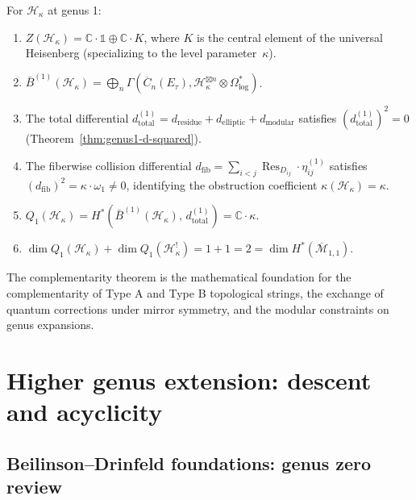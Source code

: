 \begin{example}
For $\mathcal{H}_\kappa$ at genus 1:
\begin{enumerate}
\item $Z(\mathcal{H}_\kappa) = \mathbb{C} \cdot \mathbb{1} \oplus \mathbb{C} \cdot
K$, where $K$ is the central element of the universal Heisenberg
(specializing to the level parameter~$\kappa$).
\item $\bar{B}^{(1)}(\mathcal{H}_\kappa) = \bigoplus_n \Gamma(\overline{C}_n(E_\tau),
\mathcal{H}_\kappa^{\boxtimes n} \otimes \Omega^*_{\log})$.
\item The total differential $d^{(1)}_{\mathrm{total}} = d_{\mathrm{residue}} +
d_{\mathrm{elliptic}} + d_{\mathrm{modular}}$ satisfies
$(d^{(1)}_{\mathrm{total}})^2 = 0$
(Theorem~\ref{thm:genus1-d-squared}).
\item The fiberwise collision differential
$d_{\mathrm{fib}} = \sum_{i<j} \operatorname{Res}_{D_{ij}} \cdot \eta_{ij}^{(1)}$ satisfies
$(d_{\mathrm{fib}})^2 = \kappa \cdot \omega_1 \neq 0$,
identifying the obstruction coefficient $\kappa(\mathcal{H}_\kappa) = \kappa$.
\item $Q_1(\mathcal{H}_\kappa) = H^*(\bar{B}^{(1)}(\mathcal{H}_\kappa),\,
d^{(1)}_{\mathrm{total}}) = \mathbb{C} \cdot \kappa$.
\item $\dim Q_1(\mathcal{H}_\kappa) + \dim Q_1(\mathcal{H}_\kappa^!) = 1 + 1 = 2 =
\dim H^*(\overline{\mathcal{M}}_{1,1})$.
\end{enumerate}
\end{example}


\begin{remark}
\label{rem:string-theory-complementarity}
The complementarity theorem is the mathematical foundation for the
complementarity of Type A and Type B topological strings, the
exchange of quantum corrections under mirror symmetry, and the
modular constraints on genus expansions.
\end{remark}

\section{Higher genus extension: descent and acyclicity}
\label{sec:higher-genus-descent}

\subsection{Beilinson--Drinfeld foundations: genus zero review}
\label{subsec:BD-genus-zero-review}

